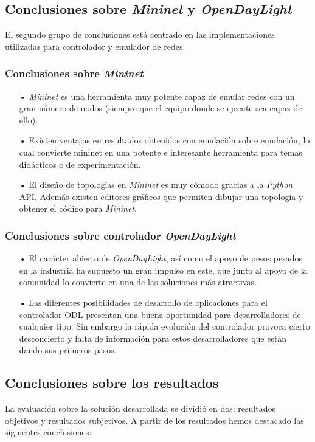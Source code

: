 \documentclass[a4paper,11pt]{book}
\begin{document}
\subsection{Conclusiones sobre \emph{Mininet} y \emph{OpenDayLight}}

El segundo grupo de conclusiones está centrado en las implementaciones utilizadas para controlador y emulador de redes.

\subsubsection{Conclusiones sobre \emph{Mininet}}
\begin{itemize}
\item[•] \emph{Mininet} es una herramienta muy potente capaz de emular redes con un gran número de nodos (siempre que el equipo donde se ejecute sea capaz de ello). 
\item[•] Existen ventajas en resultados obtenidos con emulación sobre emulación, lo cual convierte mininet en una potente e interesante herramienta para temas didácticos o de experimentación.
\item[•] El diseño de topologías en \emph{Mininet} es muy cómodo gracias a la \textit{Python} \ac{API}. Además existen editores gráficos que permiten dibujar una topología y obtener el código para \emph{Mininet}.
\end{itemize}

\subsubsection{Conclusiones sobre controlador \emph{OpenDayLight}}
\begin{itemize}
\item[•] El carácter abierto de \emph{OpenDayLight}, así como el apoyo de pesos pesados en la industria ha supuesto un gran impulso en este, que junto al apoyo de la comunidad lo convierte en una de las soluciones más atractivas.
\item[•] Las diferentes posibilidades de desarrollo de aplicaciones para el controlador \ac{ODL} presentan una buena oportunidad para desarrolladores de cualquier tipo. Sin embargo la rápida evolución del controlador provoca cierto desconcierto y falta de información para estos desarrolladores que están dando sus primeros pasos.
\end{itemize}

\subsection{Conclusiones sobre los resultados}
La evaluación sobre la solución desarrollada se dividió en dos: resultados objetivos y resultados subjetivos. A partir de los resultados hemos destacado las siguientes conclusiones:
\end{document}

